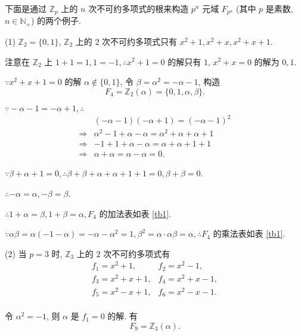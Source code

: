 \documentclass[color=black,device=normal,lang=cn,mode=geye]{elegantnote}
\begin{document}
\begin{example}
    下面是通过 $\mathbb{Z}_p$ 上的 $n$ 次不可约多项式的根来构造 $p^n$ 元域 $F_{p^n}$ (其中 $p$ 是素数, $n\in\mathbb{N}_+$) 的两个例子.

    (1) $\mathbb{Z}_2=\{0,1\}$, $\mathbb{Z}_2$ 上的 $2$ 次不可约多项式只有 $x^2+1,x^2+x,x^2+x+1$.

    注意在 $\mathbb{Z}_2$ 上 $1+1=1,1=-1,\therefore x^2+1=0$ 的解只有 $1$, $x^2+x=0$ 的解为 $0,1$.

    $\because x^2+x+1=0$ 的解 $\alpha\notin\{0,1\}$, 令 $\beta=\alpha^2=-\alpha-1$, 构造
    \[F_4=\mathbb{Z}_2(\alpha)=\{0,1,\alpha,\beta\}.\]
    
    $\because-\alpha-1=-\alpha+1,\therefore$
    \begin{align*}
        & (-\alpha-1)(-\alpha+1)=(-\alpha-1)^2 \\
        \Rightarrow & \alpha^2-1+\alpha-\alpha=\alpha^2+\alpha+\alpha+1 \\
        \Rightarrow & -1+1+\alpha-\alpha=\alpha+\alpha+1+1 \\
        \Rightarrow & \alpha+\alpha=\alpha-\alpha=0.
    \end{align*}

    $\because\beta+\alpha+1=0,\therefore\beta+\beta+\alpha+\alpha+1+1=0,\beta+\beta=0$.

    $\therefore-\alpha=\alpha,-\beta=\beta$.
    
    $\therefore1+\alpha=\beta,1+\beta=\alpha,F_4$ 的加法表如表 \ref{tb1}.

    $\because\alpha\beta=\alpha(-1-\alpha)=-\alpha-\alpha^2=1,\beta^2=\alpha\cdot\alpha\beta=\alpha,\therefore F_4$ 的乘法表如表 \ref{tb1}.

    (2) 当 $p=3$ 时, $\mathbb{Z}_3$ 上的 $2$ 次不可约多项式有
    \[\begin{array}{ll}
        f_1=x^2+1, & f_2=x^2-1, \\
        f_3=x^2+x+1, & f_4=x^2+x-1, \\
        f_5=x^2-x+1, & f_6=x^2-x-1. \\
    \end{array}\]

    令 $\alpha^2=-1$, 则 $\alpha$ 是 $f_1=0$ 的解. 有
    \[F_9=\mathbb{Z}_3(\alpha).\]
\end{example}
\end{document}
